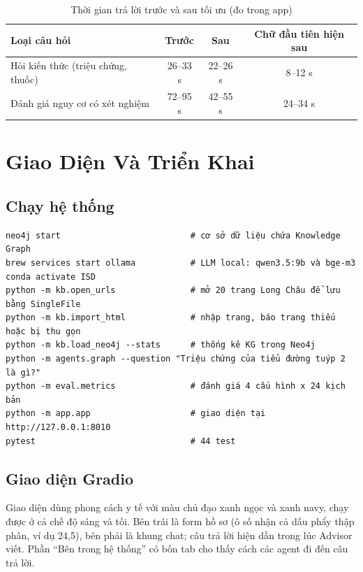 \documentclass[12pt,a4paper]{report}
\begin{document}
\begin{table}[H]
\centering
\caption{Thời gian trả lời trước và sau tối ưu (đo trong app)}
\label{tab:speed}
\begin{tabular}{lccc}
\toprule
\textbf{Loại câu hỏi} & \textbf{Trước} & \textbf{Sau} & \textbf{Chữ đầu tiên hiện sau} \\
\midrule
Hỏi kiến thức (triệu chứng, thuốc) & 26--33 s & 22--26 s & 8--12 s \\
Đánh giá nguy cơ có xét nghiệm & 72--95 s & 42--55 s & 24--34 s \\
\bottomrule
\end{tabular}
\end{table}

\chapter{Giao Diện Và Triển Khai}

\section{Chạy hệ thống}
\begin{listing}[H]
\begin{verbatim}
neo4j start                          # cơ sở dữ liệu chứa Knowledge Graph
brew services start ollama           # LLM local: qwen3.5:9b và bge-m3
conda activate ISD
python -m kb.open_urls               # mở 20 trang Long Châu để lưu bằng SingleFile
python -m kb.import_html             # nhập trang, báo trang thiếu hoặc bị thu gọn
python -m kb.load_neo4j --stats      # thống kê KG trong Neo4j
python -m agents.graph --question "Triệu chứng của tiểu đường tuýp 2 là gì?"
python -m eval.metrics               # đánh giá 4 cấu hình x 24 kịch bản
python -m app.app                    # giao diện tại http://127.0.0.1:8010
pytest                               # 44 test
\end{verbatim}
\caption{Khởi động dịch vụ và các bước chạy từ thư mục \texttt{src/Project}}
\label{lst:run}
\end{listing}

\section{Giao diện Gradio}
Giao diện dùng phong cách y tế với màu chủ đạo xanh ngọc và xanh navy, chạy được ở cả chế độ
sáng và tối. Bên trái là form hồ sơ (ô số nhận cả dấu phẩy thập phân, ví dụ 24,5), bên phải là
khung chat; câu trả lời hiện dần trong lúc Advisor viết. Phần ``Bên trong hệ thống'' có bốn tab
cho thấy cách các agent đi đến câu trả lời.
\end{document}
